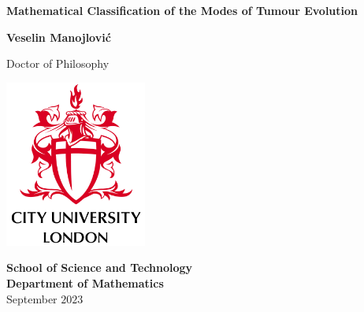 \begin{titlepage}
    \begin{center}
        \vspace*{2mm}
        
        \begin{spacing}{1.2}
        \Huge
        \textbf{Mathematical Classification of the Modes of Tumour Evolution}
 		\end{spacing}
        
        \vspace{1cm}
        \Large
        \textbf{Veselin Manojlovi\'c}

        \vspace{1.5cm}
        
        \begin{spacing}{1}
        Doctor of Philosophy\\
        \end{spacing}
        
        \vspace{2cm} 
		
	    \includegraphics[width=0.35\textwidth]{Frontmatter/CU_logo_S1}
	    
	    \vspace{1cm}

		\textbf{School of Science and Technology}\\
        \textbf{Department of Mathematics}\\
        
        \vfill
        September $2023$
        
    \end{center}
\end{titlepage}
